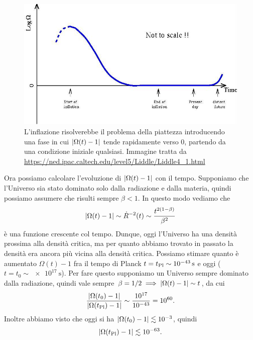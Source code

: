\begin{figure}
  \centering
  \includegraphics[width=\textwidth]{figure/flatness}
  \caption[Come l'inflazione risolverebbe il problema della
  piattezza]{L'inflazione risolverebbe il problema della piattezza introducendo
    una fase in cui \(\lvert\Omega(t) - 1\rvert\) tende rapidamente verso \(0\),
    partendo da una condizione iniziale qualsiasi.  Immagine tratta da
    \url{https://ned.ipac.caltech.edu/level5/Liddle/Liddle4_1.html}}
  \label{fig:piattezza}
\end{figure}
Ora possiamo calcolare l'evoluzione di \(\lvert\Omega(t) - 1\rvert\) con il tempo.
Supponiamo che l'Universo sia stato dominato solo dalla radiazione e dalla
materia, quindi possiamo assumere che risulti sempre \(\beta < 1\).  In questo
modo vediamo che
\begin{equation}
  \label{eq:omega-t}
  \lvert\Omega(t) - 1\rvert \sim \dot{R}^{-2}(t) \sim \frac{t^{2(1-\beta)}}{\beta^{2}}
\end{equation}
è una funzione crescente col tempo.  Dunque, oggi l'Universo ha una densità
prossima alla densità critica, ma per quanto abbiamo trovato in passato la
densità era ancora più vicina alla densità critica.  Possiamo stimare quanto è
aumentato \(\Omega(t) - 1\) fra il tempo di Planck \(t = t_{\textup{Pl}} \sim
\SI{e-43}{\second}\) e oggi (\(t = t_{0} \sim \SI{e17}{\second}\)).  Per fare
questo supponiamo un Universo sempre dominato dalla radiazione, quindi vale
sempre \(\beta = 1/2 \implies \lvert\Omega(t) - 1\rvert \sim t\), da cui
\begin{equation}
  \frac{\lvert\Omega(t_{0}) - 1\rvert}{\lvert\Omega(t_{\textup{Pl}}) - 1\rvert} \sim
  \frac{10^{17}}{10^{-43}} = 10^{60}.
\end{equation}
Inoltre abbiamo visto che oggi si ha \(\lvert\Omega(t_{0}) - 1\rvert \lesssim
10^{-3}\), quindi
\begin{equation}
  \lvert\Omega(t_{\textup{Pl}}) - 1\rvert \lesssim 10^{-63}.
\end{equation}

